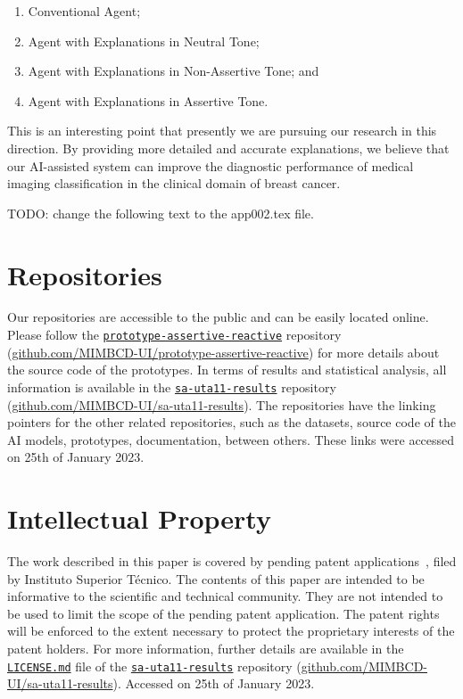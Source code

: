 \begin{enumerate}
\item Conventional Agent;
\item Agent with Explanations in Neutral Tone;
\item Agent with Explanations in Non-Assertive Tone; and
\item Agent with Explanations in Assertive Tone.
\end{enumerate}

\vspace{0.5mm}

This is an interesting point that presently we are pursuing our research in this direction.
By providing more detailed and accurate explanations, we believe that our AI-assisted system can improve the diagnostic performance of medical imaging classification in the clinical domain of breast cancer.

TODO: change the following text to the app002.tex file.

\section{Repositories}
\label{sec:app001sec010}

Our repositories are accessible to the public and can be easily located online.
Please follow the \texttt{\href{https://github.com/MIMBCD-UI/prototype-assertive-reactive}{prototype-assertive-reactive}} repository (\href{https://github.com/MIMBCD-UI/prototype-assertive-reactive}{github.com/MIMBCD-UI/prototype-assertive-reactive}) for more details about the source code of the prototypes.
In terms of results and statistical analysis, all information is available in the \texttt{\href{https://github.com/MIMBCD-UI/sa-uta11-results}{sa-uta11-results}} repository (\href{https://github.com/MIMBCD-UI/sa-uta11-results}{github.com/MIMBCD-UI/sa-uta11-results}).
The repositories have the linking pointers for the other related repositories, such as the datasets, source code of the AI models, prototypes, documentation, between others.
These links were accessed on 25th of January 2023.

\section{Intellectual Property}
\label{sec:app001sec011}

The work described in this paper is covered by pending patent applications~\cite{WO2022071818A1}, filed by Instituto Superior T\'{e}cnico.
The contents of this paper are intended to be informative to the scientific and technical community.
They are not intended to be used to limit the scope of the pending patent application.
The patent rights will be enforced to the extent necessary to protect the proprietary interests of the patent holders.
For more information, further details are available in the \texttt{\href{https://github.com/MIMBCD-UI/sa-uta11-results/blob/main/LICENSE.md}{LICENSE.md}} file of the \texttt{\href{https://github.com/MIMBCD-UI/sa-uta11-results}{sa-uta11-results}} repository (\href{https://github.com/MIMBCD-UI/sa-uta11-results}{github.com/MIMBCD-UI/sa-uta11-results}).
Accessed on 25th of January 2023.